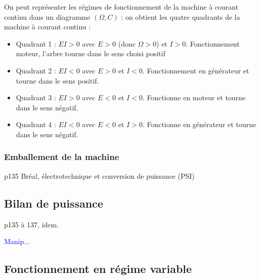 \documentclass[11pt,a4paper]{report}
\begin{document}
On peut représenter les régimes de fonctionnement de la machine à courant continu dans un diagramme $(\Omega, C)$ : on obtient les quatre quadrants de la machine à courant continu :
\begin{itemize}
	\item Quadrant 1 : $EI > 0$ avec $E > 0$ (donc  $\Omega > 0$) et $I > 0$. 
		Fonctionnement moteur, l'arbre tourne dans le sens choisi positif
	\item Quadrant 2 : $EI < 0$ avec $E > 0$ et $I < 0$. 
		Fonctionnement en générateur et tourne dans le sens positif.
	\item Quadrant 3 : $EI > 0$ avec $E < 0$ et $I < 0$. 
	Fonctionne en moteur et tourne dans le sens négatif.
	\item Quadrant 4 : $EI < 0$ avec $E < 0$ et $I > 0$. 
	Fonctionne en générateur et tourne dans le sens négatif.
\end{itemize}

\subsubsection*{Emballement de la machine}

p135 Bréal, électrotechnique et conversion de puissance (PSI)

\subsection{Bilan de puissance}

p135 à 137, idem.

\textcolor{blue}{Manip...}
                                                                                                                                                                                                                                   
\subsection{Fonctionnement en régime variable}
\end{document}
